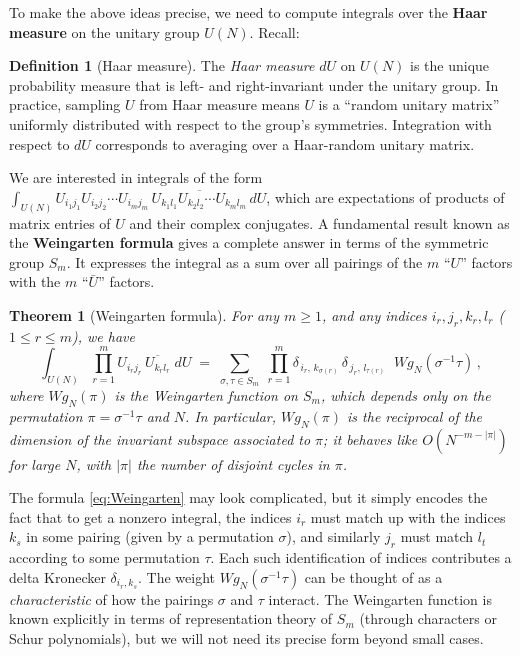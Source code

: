 \documentclass[letterpaper,11pt,oneside,reqno]{article}
\numberwithin{equation}{section}
\newtheorem{theorem}[proposition]{Theorem}
\theoremstyle{definition}
\newtheorem{definition}[proposition]{Definition}
\begin{document}
To make the above ideas precise, we need to compute integrals over the \textbf{Haar measure} on the unitary group $U(N)$. Recall:

\begin{definition}[Haar measure]
The \emph{Haar measure} $dU$ on $U(N)$ is the unique probability measure that is left- and right-invariant under the unitary group. In practice, sampling $U$ from Haar measure means $U$ is a ``random unitary matrix'' uniformly distributed with respect to the group's symmetries. Integration with respect to $dU$ corresponds to averaging over a Haar-random unitary matrix.
\end{definition}

We are interested in integrals of the form $\int_{U(N)} U_{i_1 j_1}U_{i_2 j_2}\cdots U_{i_m j_m} \,\overline{U_{k_1 l_1}U_{k_2 l_2}\cdots U_{k_m l_m}}\,dU$, which are expectations of products of matrix entries of $U$ and their complex conjugates. A fundamental result known as the \textbf{Weingarten formula} gives a complete answer in terms of the symmetric group $S_m$. It expresses the integral as a sum over all pairings of the $m$ ``$U$'' factors with the $m$ ``$\bar U$'' factors.

\begin{theorem}[Weingarten formula]
For any $m\ge 1$, and any indices $i_r,j_r,k_r,l_r$ ($1\le r \le m$), we have
\begin{equation}\label{eq:Weingarten}
\int_{U(N)} \prod_{r=1}^m U_{i_r j_r}\,\overline{U_{k_r l_r}}\;dU \;=\; \sum_{\sigma,\tau \in S_m} \;\prod_{r=1}^m \delta_{\,i_r,\,k_{\sigma(r)}}\,\delta_{\,j_r,\,l_{\tau(r)}}\;\;Wg_N(\sigma^{-1}\tau)\,,
\end{equation}
where $Wg_N(\pi)$ is the \emph{Weingarten function} on $S_m$, which depends only on the permutation $\pi=\sigma^{-1}\tau$ and $N$. In particular, $Wg_N(\pi)$ is the reciprocal of the dimension of the invariant subspace associated to $\pi$; it behaves like $O(N^{-m-|\pi|})$ for large $N$, with $|\pi|$ the number of disjoint cycles in $\pi$.
\end{theorem}

The formula \eqref{eq:Weingarten} may look complicated, but it simply encodes the fact that to get a nonzero integral, the indices $i_r$ must match up with the indices $k_s$ in some pairing (given by a permutation $\sigma$), and similarly $j_r$ must match $l_t$ according to some permutation $\tau$. Each such identification of indices contributes a delta Kronecker $\delta_{i_r,k_{s}}$. The weight $Wg_N(\sigma^{-1}\tau)$ can be thought of as a \emph{characteristic} of how the pairings $\sigma$ and $\tau$ interact. The Weingarten function is known explicitly in terms of representation theory of $S_m$ (through characters or Schur polynomials), but we will not need its precise form beyond small cases.
\end{document}
